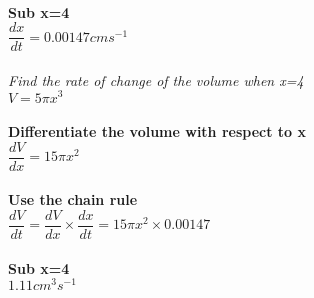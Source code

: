 \documentclass{article}[18pt]
\begin{document}
\\
\textbf{Sub x=4}\\
$\dfrac{dx}{dt}=0.00147cms^{-1}$\\
\\
\textit{Find the rate of change of the volume when x=4}\\
$V=5\pi x^3$\\
\\
\textbf{Differentiate the volume with respect to x}\\
$\dfrac{dV}{dx}=15\pi x^2$\\
\\
\textbf{Use the chain rule}\\
$\dfrac{dV}{dt}=\dfrac{dV}{dx}\times\dfrac{dx}{dt}=15\pi x^2\times 0.00147$\\
\\
\textbf{Sub x=4}\\
$1.11cm^3s^{-1}$
\end{document}
